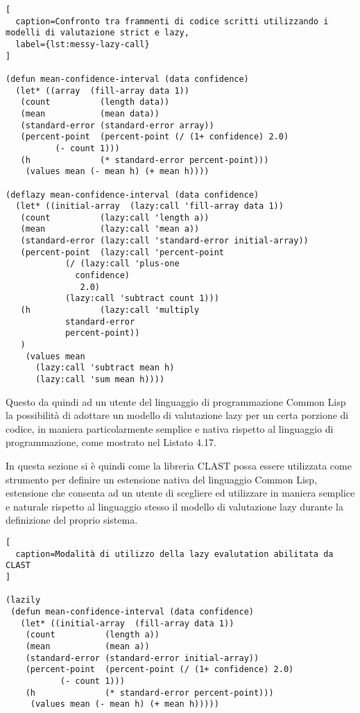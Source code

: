 \begin{lstlisting}[
  caption=Confronto tra frammenti di codice scritti utilizzando i modelli di valutazione strict e lazy,
  label={lst:messy-lazy-call}
]

(defun mean-confidence-interval (data confidence)
  (let* ((array  (fill-array data 1))
   (count          (length data))
   (mean           (mean data))
   (standard-error (standard-error array))
   (percent-point  (percent-point (/ (1+ confidence) 2.0)
          (- count 1)))
   (h              (* standard-error percent-point)))
    (values mean (- mean h) (+ mean h))))

(deflazy mean-confidence-interval (data confidence)
  (let* ((initial-array  (lazy:call 'fill-array data 1))
   (count          (lazy:call 'length a))
   (mean           (lazy:call 'mean a))
   (standard-error (lazy:call 'standard-error initial-array))
   (percent-point  (lazy:call 'percent-point
            (/ (lazy:call 'plus-one
              confidence)
               2.0)
            (lazy:call 'subtract count 1)))
   (h              (lazy:call 'multiply
            standard-error
            percent-point))
   )
    (values mean
      (lazy:call 'subtract mean h)
      (lazy:call 'sum mean h))))

\end{lstlisting}

Questo da quindi ad un utente del linguaggio di programmazione Common Lisp la
possibilità di adottare un modello di valutazione lazy per un certa porzione di
codice, in maniera particolarmente semplice e nativa rispetto al linguaggio di
programmazione, come mostrato nel Listato 4.17.

In questa sezione si è quindi come la libreria CLAST possa essere utilizzata
come strumento per definire un estensione nativa del linguaggio Common Lisp,
estensione che consenta ad un utente di scegliere ed utilizzare in maniera
semplice e naturale rispetto al linguaggio stesso il modello di valutazione lazy
durante la definizione del proprio sistema.

\begin{lstlisting}[
  caption=Modalità di utilizzo della lazy evalutation abilitata da CLAST
]

(lazily
 (defun mean-confidence-interval (data confidence)
   (let* ((initial-array  (fill-array data 1))
    (count          (length a))
    (mean           (mean a))
    (standard-error (standard-error initial-array))
    (percent-point  (percent-point (/ (1+ confidence) 2.0)
           (- count 1)))
    (h              (* standard-error percent-point)))
     (values mean (- mean h) (+ mean h)))))

\end{lstlisting}
